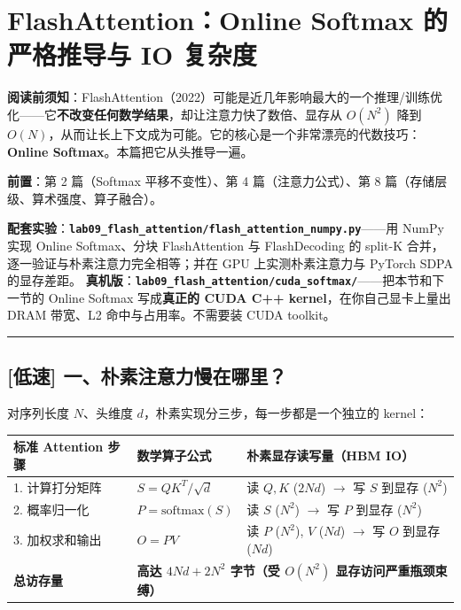 \chapter{FlashAttention：Online Softmax 的严格推导与 IO 复杂度}

\begin{warningBox}[避坑指南与核心警示]
\textbf{阅读前须知}：FlashAttention（2022）可能是近几年影响最大的一个推理/训练优化——它\textbf{不改变任何数学结果}，却让注意力快了数倍、显存从 $O(N^2)$ 降到 $O(N)$，从而让长上下文成为可能。它的核心是一个非常漂亮的代数技巧：\textbf{Online Softmax}。本篇把它从头推导一遍。

\textbf{前置}：第 2 篇（Softmax 平移不变性）、第 4 篇（注意力公式）、第 8 篇（存储层级、算术强度、算子融合）。

\textbf{配套实验}：\textbf{\texttt{lab09\_flash\_attention/flash\_attention\_numpy.py}}——用 NumPy 实现 Online Softmax、分块 FlashAttention 与 FlashDecoding 的 split-K 合并，逐一验证与朴素注意力完全相等；并在 GPU 上实测朴素注意力与 PyTorch SDPA 的显存差距。
\textbf{真机版}：\textbf{\texttt{lab09\_flash\_attention/cuda\_softmax/}}——把本节和下一节的 Online Softmax 写成\textbf{真正的 CUDA C++ kernel}，在你自己显卡上量出 DRAM 带宽、L2 命中与占用率。不需要装 CUDA toolkit。
\end{warningBox}

\vspace{0.8em}\hrule\vspace{0.8em}

\section{[低速] 一、朴素注意力慢在哪里？}

对序列长度 $N$、头维度 $d$，朴素实现分三步，每一步都是一个独立的 kernel：

\begin{center}
\small
\begin{tabularx}{\textwidth}{l X X}
\toprule
\textbf{标准 Attention 步骤} & \textbf{数学算子公式} & \textbf{朴素显存读写量（HBM IO）} \\
\midrule
1. 计算打分矩阵 & $S = Q K^T / \sqrt{d}$ & 读 $Q, K$ ($2Nd$) $\longrightarrow$ 写 $S$ 到显存 ($N^2$) \\
2. 概率归一化 & $P = \mathrm{softmax}(S)$ & 读 $S$ ($N^2$) $\longrightarrow$ 写 $P$ 到显存 ($N^2$) \\
3. 加权求和输出 & $O = P V$ & 读 $P$ ($N^2$), $V$ ($Nd$) $\longrightarrow$ 写 $O$ 到显存 ($Nd$) \\
\midrule
\textbf{总访存量} & \multicolumn{2}{l}{\textbf{高达 $4Nd + 2N^2$ 字节（受 $O(N^2)$ 显存访问严重瓶颈束缚）}} \\
\bottomrule
\end{tabularx}
\end{center}

